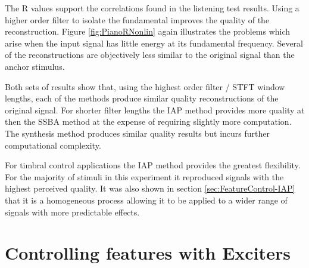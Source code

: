 		The R values support the correlations found in the listening test results. Using a higher order
		filter to isolate the fundamental improves the quality of the reconstruction. Figure \ref{fig:PianoRNonlin}
		again illustrates the problems which arise when the input signal has little energy at its fundamental
		frequency. Several of the reconstructions are objectively less similar to the original signal than the
		anchor stimulus.

		Both sets of results show that, using the highest order filter / STFT window lengths, each of the methods
		produce similar quality reconstructions of the original signal. For shorter filter lengths the IAP method
		provides more quality at then the SSBA method at the expense of requiring slightly more computation. The
		synthesis method produces similar quality results but incurs further computational complexity. 
		
		For timbral control applications the IAP method provides the greatest flexibility. For the majority of
		stimuli in this experiment it reproduced signals with the highest perceived quality. It was also shown in
		section \ref{sec:FeatureControl-IAP} that it is a homogeneous process allowing it to be applied to a wider
		range of signals with more predictable effects.

\section{Controlling features with Exciters}
\label{sec:FeatureControl-Control}
